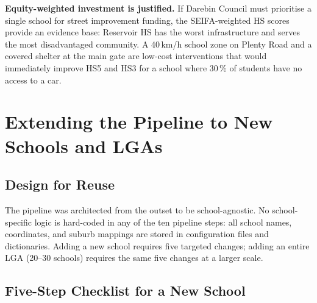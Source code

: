 \documentclass[11pt,a4paper,openany]{book}
\begin{document}
\textbf{Equity-weighted investment is justified.}  If Darebin Council must prioritise
a single school for street improvement funding, the SEIFA-weighted HS scores provide an
evidence base: Reservoir HS has the worst infrastructure and serves the most
disadvantaged community.  A 40\,km/h school zone on Plenty Road and a covered shelter
at the main gate are low-cost interventions that would immediately improve HS5 and HS3
for a school where 30\,\% of students have no access to a car.

\chapter{Extending the Pipeline to New Schools and LGAs}

\section{Design for Reuse}

The pipeline was architected from the outset to be school-agnostic.  No school-specific
logic is hard-coded in any of the ten pipeline steps: all school names, coordinates, and
suburb mappings are stored in configuration files and dictionaries.  Adding a new school
requires five targeted changes; adding an entire LGA (20--30 schools) requires the same
five changes at a larger scale.

\section{Five-Step Checklist for a New School}
\end{document}
